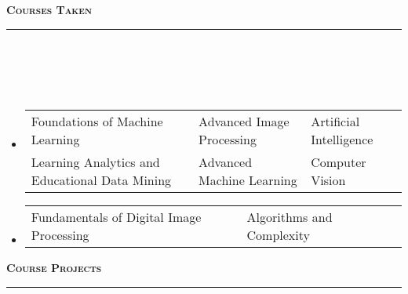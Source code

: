 \documentclass[a4paper,10pt]{article}
\newcommand{\lsep}{-0.5cm}
\newcommand{\resheading}[1]{{\small
        {
            \begin{minipage}
                {0.992\textwidth}\textbf{{\textsc{#1 \vphantom{p\^{E}} }}}
                \\[-0.3cm]
                \hrule
            \end{minipage}
            \\[-0.5cm]
        }
 }}
\begin{document}
\vspace{0.05cm}
\resheading{\textbf{\large Courses Taken }}\\[\lsep]
\\[-0.275cm]
\begin{itemize}
    \item[] \begin{tabular}{p{8cm}p{5cm}l }
    Foundations of Machine Learning & Advanced Image Processing  & Artificial Intelligence\\ 
    Learning Analytics and Educational Data Mining & Advanced Machine Learning   &  Computer Vision
    \end{tabular}
    \vspace{-0.25cm}
    \item[] \begin{tabular}{p{8cm}p{5cm}l }
    Fundamentals of Digital Image Processing & Algorithms and Complexity
    \end{tabular}
\end{itemize}
\vspace{-0.1cm}
\resheading{\textbf{\large Course Projects}}\\[\lsep]
\\[-0.35cm]
\end{document}
